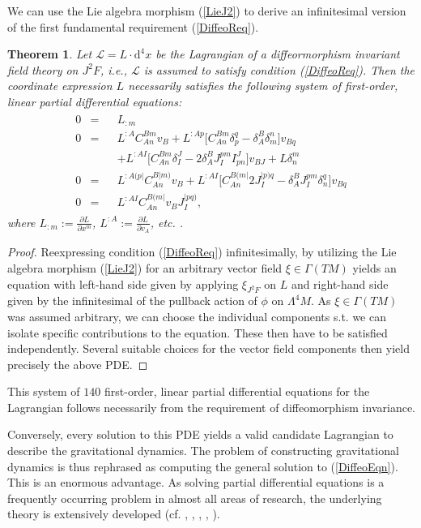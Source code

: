\documentclass[%
 reprint,
nofootinbib,
 amsmath,amssymb,
 aps,
 prd,
floatfix,
]{revtex4-2}
\newtheorem{theorem}{Theorem}
\begin{document}
We can use the Lie algebra morphism (\ref{LieJ2}) to derive an infinitesimal version of the first fundamental requirement (\ref{DiffeoReq}).
\begin{theorem}
Let $\mathcal{L} = L \cdot \mathrm{d}^4x$ be the Lagrangian of a diffeormorphism invariant field theory on $J^2F$, i.e., $\mathcal{L}$ is assumed to satisfy condition (\ref{DiffeoReq}). Then the coordinate expression $L$ necessarily satisfies the following system of first-order, linear partial differential equations:  
\begin{align}\label{DiffeoEqn}
\begin{aligned}
    0 &= &&L_{:m} \\
    0 &= &&L^{:A} C_{An}^{Bm} v_B + L^{:Ap} \bigl[ C_{An}^{Bm} \delta_p^q - \delta_A^B \delta_m^n \bigr] v_{Bq}\\
    & &&+ L^{:AI} \bigl[ C_{An}^{Bm} \delta_I^J - 2 \delta_A^B J_I^{pm} I^J_{pn}  \bigr] v_{BJ} + L \delta^m_n \\
    0 &= &&L^{:A(p\vert}C_{An}^{B \vert m)} v_B + L^{: AI} \bigl[ C_{An}^{B(m\vert} 2 J_I^{\vert p) q} - \delta^B_A J_I ^{pm} \delta_n^q \bigr] v_{Bq} \\
    0 &= &&L^{:AI} C_{An}^{B(m\vert} v_B J_I^{\vert p q )},
\end{aligned}
\end{align}
where $L_{:m} := \frac{\partial L}{\partial x^m}$, $L^{:A} := \frac{\partial L}{ \partial v_A}$, etc. .
\end{theorem}
\begin{proof}
Reexpressing condition (\ref{DiffeoReq}) infinitesimally, by utilizing the Lie algebra morphism (\ref{LieJ2}) for an arbitrary vector field $\xi \in \Gamma(TM)$ yields an equation with left-hand side given by applying $\xi_{J^2F}$ on $L$ and right-hand side given by the infinitesimal of the pullback action of $\phi$ on $\Lambda^4M$.
As $\xi \in \Gamma(TM)$ was assumed arbitrary, we can choose the individual components s.t. we can isolate specific contributions to the equation. These then have to be satisfied independently. Several suitable choices for the vector field components then yield precisely the above PDE. 
\end{proof}

This system of $140$ first-order, linear partial differential equations for the Lagrangian follows necessarily from the requirement of diffeomorphism invariance. 
\iffalse
Therefore the notoriously difficult requirement of diffeomorphism invariant gravitational dynamics is translated into the much simpler condition that the gravitational Lagrangian be a solution to (\ref{DiffeoEqn}). 
\fi
Conversely, every solution to this PDE yields a valid candidate Lagrangian to describe the gravitational dynamics. 
The problem of constructing gravitational dynamics is thus rephrased as computing the general solution to (\ref{DiffeoEqn}). 
This is an enormous advantage. As solving partial differential equations is a frequently occurring problem in almost all areas of research, the underlying theory is extensively developed (cf. \cite{seiler2009involution}, \cite{hormander1994analysis}, \cite{hormander2009analysis}, \cite{hormander2015analysis}, \cite{Hilbert}).
\end{document}

